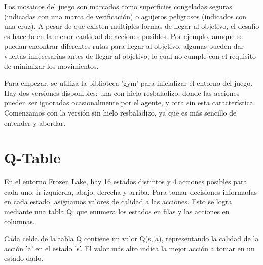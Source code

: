 \documentclass{article}
\begin{document}
\vspace{0.5cm}

Los mosaicos del juego son marcados como superficies congeladas seguras (indicadas con una marca de verificación) o agujeros peligrosos (indicados con una cruz). A pesar de que existen múltiples formas de llegar al objetivo, el desafío es hacerlo en la menor cantidad de acciones posibles. Por ejemplo, aunque se puedan encontrar diferentes rutas para llegar al objetivo, algunas pueden dar vueltas innecesarias antes de llegar al objetivo, lo cual no cumple con el requisito de minimizar los movimientos.

\vspace{0.5cm}

Para empezar, se utiliza la biblioteca 'gym' para inicializar el entorno del juego. Hay dos versiones disponibles: una con hielo resbaladizo, donde las acciones pueden ser ignoradas ocasionalmente por el agente, y otra sin esta característica. Comenzamos con la versión sin hielo resbaladizo, ya que es más sencillo de entender y abordar.

\vspace{1cm}

\section{Q-Table}

\vspace{1cm}

En el entorno Frozen Lake, hay 16 estados distintos y 4 acciones posibles para cada uno: ir izquierda, abajo, derecha y arriba. Para tomar decisiones informadas en cada estado, asignamos valores de calidad a las acciones. Esto se logra mediante una tabla Q, que enumera los estados en filas y las acciones en columnas.

\vspace{0.5cm}

Cada celda de la tabla Q contiene un valor Q(s, a), representando la calidad de la acción 'a' en el estado 's'. El valor más alto indica la mejor acción a tomar en un estado dado.

\vspace{0.5cm}
\end{document}
